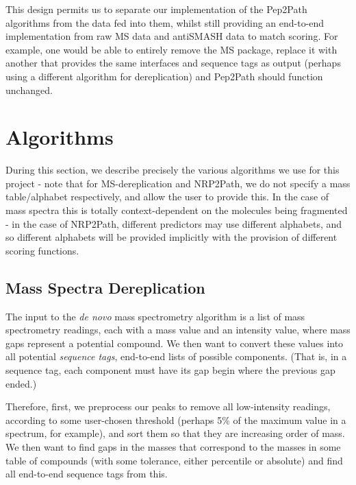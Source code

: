 \documentclass{l4proj}
\begin{document}
This design permits us to separate our implementation of the Pep2Path algorithms from the data fed into them, whilst still providing an end-to-end implementation from raw MS data and antiSMASH data to match scoring. For example, one would be able to entirely remove the MS package, replace it with another that provides the same interfaces and sequence tags as output (perhaps using a different algorithm for dereplication) and Pep2Path should function unchanged.

\section{Algorithms}

During this section, we describe precisely the various algorithms we use for this project - note that for MS-dereplication and NRP2Path, we do not specify a mass table/alphabet respectively, and allow the user to provide this. In the case of mass spectra this is totally context-dependent on the molecules being fragmented - in the case of NRP2Path, different predictors may use different alphabets, and so different alphabets will be provided implicitly with the provision of different scoring functions.

\subsection{Mass Spectra Dereplication}

The input to the \textit{de novo} mass spectrometry algorithm is a list of mass spectrometry readings, each with a mass value and an intensity value, where mass gaps represent a potential compound. We then want to convert these values into all potential \textit{sequence tags}, end-to-end lists of possible components. (That is, in a sequence tag, each component must have its gap begin where the previous gap ended.) 

Therefore, first, we preprocess our peaks to remove all low-intensity readings, according to some user-chosen threshold (perhaps 5\% of the maximum value in a spectrum, for example), and sort them so that they are increasing order of mass. We then want to find gaps in the masses that correspond to the masses in some table of compounds (with some tolerance, either percentile or absolute) and find all end-to-end sequence tags from this.
\end{document}
